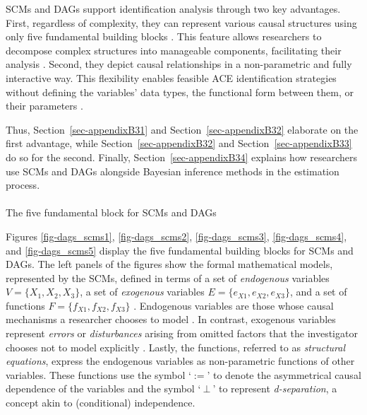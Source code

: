 \documentclass[
  authoryear,
  review,
  1p]{elsarticle}
\makeatletter
\let\oldparagraph\paragraph
\renewcommand{\paragraph}{
    \@ifstar
      \xxxParagraphStar
      \xxxParagraphNoStar
  }
\newcommand{\xxxParagraphStar}[1]{\oldparagraph*{#1}\mbox{}}
\newcommand{\xxxParagraphNoStar}[1]{\oldparagraph{#1}\mbox{}}
\makeatother
\begin{document}
SCMs and DAGs support identification analysis through two key
advantages. First, regardless of complexity, they can represent various
causal structures using only five fundamental building blocks
\citep{Neal_2020, McElreath_2020}. This feature allows researchers to
decompose complex structures into manageable components, facilitating
their analysis \citep{McElreath_2020}. Second, they depict causal
relationships in a non-parametric and fully interactive way. This
flexibility enables feasible ACE identification strategies without
defining the variables' data types, the functional form between them, or
their parameters \citep[pp.~35]{Pearl_et_al_2016}.

Thus, Section~\ref{sec-appendixB31} and Section~\ref{sec-appendixB32}
elaborate on the first advantage, while Section~\ref{sec-appendixB32}
and Section~\ref{sec-appendixB33} do so for the second. Finally,
Section~\ref{sec-appendixB34} explains how researchers use SCMs and DAGs
alongside Bayesian inference methods in the estimation process.

\paragraph{The five fundamental block for SCMs and
DAGs}\label{sec-appendixB31}

Figures \ref{fig-dags_scms1}, \ref{fig-dags_scms2},
\ref{fig-dags_scms3}, \ref{fig-dags_scms4}, and \ref{fig-dags_scms5}
display the five fundamental building blocks for SCMs and DAGs. The left
panels of the figures show the formal mathematical models, represented
by the SCMs, defined in terms of a set of \emph{endogenous} variables
\(V=\{X_{1},X_{2},X_{3}\}\), a set of \emph{exogenous} variables
\(E=\{e_{X1},e_{X2},e_{X3}\}\), and a set of functions
\(F=\{f_{X1},f_{X2},f_{X3}\}\) \citep{Pearl_2009, Cinelli_et_al_2020}.
Endogenous variables are those whose causal mechanisms a researcher
chooses to model \citep{Neal_2020}. In contrast, exogenous variables
represent \emph{errors} or \emph{disturbances} arising from omitted
factors that the investigator chooses not to model explicitly
\citep[pp.~27,68]{Pearl_2009}. Lastly, the functions, referred to as
\emph{structural equations}, express the endogenous variables as
non-parametric functions of other variables. These functions use the
symbol `\(:=\)' to denote the asymmetrical causal dependence of the
variables and the symbol `\(\:\bot\:\)' to represent
\emph{d-separation}, a concept akin to (conditional) independence.
\end{document}
